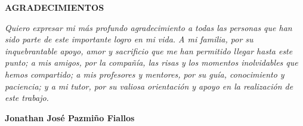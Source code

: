 \newpage
\vspace*{\fill}
\begin{flushright}
	\footnotesize
	\begin{minipage}{0.5\textwidth}
		\begin{flushright}
			\uppercase{\textbf{Agradecimientos}}
		\end{flushright}
		\itshape
		Quiero expresar mi más profundo agradecimiento a todas las personas que han sido parte de este importante logro en 
		mi vida. A mi familia, por su inquebrantable apoyo, amor y sacrificio que me han permitido llegar hasta este punto; 
		a mis amigos, por la compañía, las risas y los momentos inolvidables que hemos compartido; a mis profesores y mentores, 
		por su guía, conocimiento y paciencia; y a mi tutor, por su valiosa orientación y apoyo en la realización de este trabajo.
		\bigbreak
		\begin{flushright}
			\textbf{Jonathan José Pazmiño Fiallos}
		\end{flushright}
	\end{minipage}
\end{flushright}
\vspace*{\fill}
